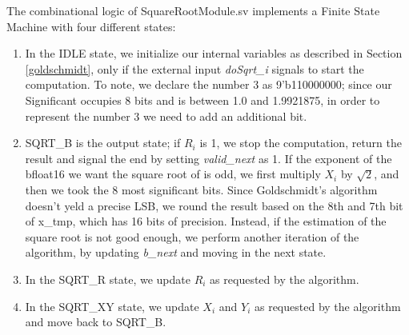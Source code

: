 The combinational logic of SquareRootModule.sv implements a Finite State Machine with four different states:
\begin{enumerate}
\item In the IDLE state, we initialize our internal variables as described in Section \ref{goldschmidt}, only if the external input \emph{doSqrt\_i} signals to start the computation. To note, we declare the number 3 as 9'b110000000; since our Significant occupies 8 bits and is between 1.0 and 1.9921875, in order to represent the number 3 we need to add an additional bit. 
\item SQRT\_B is the output state; if $R_i$ is 1, we stop the computation, return the result and signal the end by setting \emph{valid\_next} as 1. If the exponent of the bfloat16 we want the square root of is odd, we first multiply $X_i$ by $\sqrt{2}$, and then we took the 8 most significant bits. Since Goldschmidt's algorithm doesn't yeld a precise LSB, we round the result based on the 8th and 7th bit of x\_tmp, which has 16 bits of precision. Instead, if the estimation of the square root is not good enough, we perform another iteration of the algorithm, by updating \emph{b\_next} and moving in the next state.
\item In the SQRT\_R state, we update $R_i$ as requested by the algorithm.
\item In the SQRT\_XY state, we update $X_i$ and $Y_i$ as requested by the algorithm and move back to SQRT\_B.
\end{enumerate}


\clearpage
